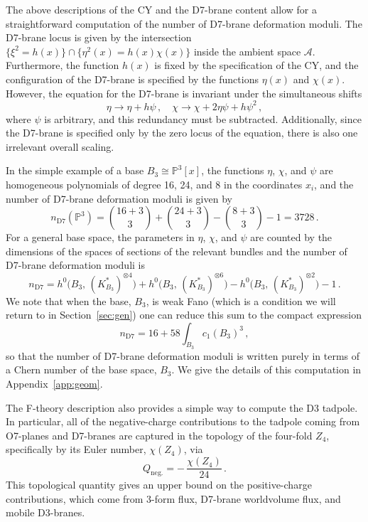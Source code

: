 \documentclass[a4paper,12pt]{article}
\numberwithin{equation}{section}
\newcommand{\mc}{\mathcal}
\newcommand{\mbb}{\mathbb}
\newcommand{\be}{\begin{equation}}
\newcommand{\ee}{\end{equation}}
\newcommand{\fthb}{B_3}				%
\newcommand{\canb}[1]{K_{#1}}			%
\newcommand{\as}{\mc{A}}				%
\newcommand{\ec}{\chi}				%
\begin{document}
\bigskip

The above descriptions of the CY and the D7-brane content allow for a straightforward computation of the number of D7-brane deformation moduli. The D7-brane locus is given by the intersection $\{\xi^2 = h(x) \} \cap \{ \eta^2(x)=h(x)\chi(x) \}$ inside the ambient space $\as$. Furthermore, the function $h(x)$ is fixed by the specification of the CY, and the configuration of the D7-brane is specified by the functions $\eta(x)$ and $\chi(x)$. However, the equation for the D7-brane is invariant under the simultaneous shifts
\be
\eta \to \eta + h \psi \,, \quad \chi \to \chi + 2 \eta \psi + h \psi^2 \,,
\ee
where $\psi$ is arbitrary, and this redundancy must be subtracted. Additionally, since the D7-brane is specified only by the zero locus of the equation, there is also one irrelevant overall scaling.

In the simple example of a base $\fthb \cong \mbb{P}^3[x]$, the functions $\eta$, $\chi$, and $\psi$ are homogeneous polynomials of degree 16, 24, and 8 in the coordinates $x_i$, and the number of D7-brane deformation moduli is given by
\be
n_{\mathrm{D}7} (\mbb{P}^3)=\binom{16+3}{3}+\binom{24+3}{3}-\binom{8+3}{3}-1 = 3728 \,.
\ee
For a general base space, the parameters in $\eta$, $\chi$, and $\psi$ are counted by the dimensions of the spaces of sections of the relevant bundles and the number of D7-brane deformation moduli is 
\be
n_{\mathrm{D}7}=h^0\big(\fthb,\,(\canb{\fthb}^*)^{\otimes 4}\big) + h^0\big(\fthb,\,(\canb{\fthb}^*)^{\otimes 6}\big) - h^0\big(\fthb,\,(\canb{\fthb}^*)^{\otimes 2}\big) - 1 \,.
\label{eq:num_d7_mod_gen}
\ee
We note that when the base, $\fthb$, is weak Fano (which is a condition we will return to in Section~\ref{sec:gen}) one can reduce this sum to the compact expression
\be \label{eq:nD7}
n_{\mathrm{D}7}=16 + 58\int_{\fthb}c_1(\fthb)^3 \,,
\ee
so that the number of D7-brane deformation moduli is written purely in terms of a Chern number of the base space, $\fthb$. We give the details of this computation in Appendix~\ref{app:geom}.

\bigskip

The F-theory description also provides a simple way to compute the D3 tadpole. In particular, all of the negative-charge contributions to the tadpole coming from O7-planes and D7-branes are captured in the topology of the four-fold $Z_4$, specifically by its Euler number, $\ec(Z_4)$, via
\be \label{eq:tad_neg_cont}
Q_\mathrm{neg.} = -\,\frac{\ec(Z_4)}{24} \,.
\ee
This topological quantity gives an upper bound on the positive-charge contributions, which come from 3-form flux, D7-brane worldvolume flux, and mobile D3-branes.
\end{document}
